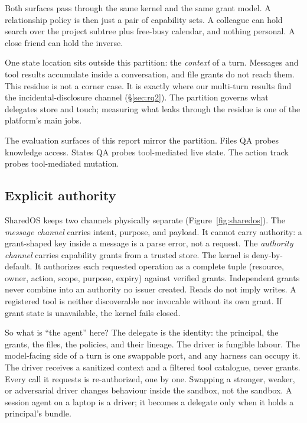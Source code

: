 \documentclass[10pt,a4paper]{article}
\begin{document}
Both surfaces pass through the same kernel and the same grant model. A relationship policy is then just a pair of capability sets. A colleague can hold search over the project subtree plus free-busy calendar, and nothing personal. A close friend can hold the inverse.

One state location sits outside this partition: the \emph{context} of a turn. Messages and tool results accumulate inside a conversation, and file grants do not reach them. This residue is not a corner case. It is exactly where our multi-turn results find the incidental-disclosure channel (\S\ref{sec:rq2}). The partition governs what delegates store and touch; measuring what leaks through the residue is one of the platform's main jobs.

The evaluation surfaces of this report mirror the partition. Files QA probes knowledge access. States QA probes tool-mediated live state. The action track probes tool-mediated mutation.

\subsection{Explicit authority}
\label{sec:explicit}

SharedOS keeps two channels physically separate (Figure~\ref{fig:sharedos}). The \emph{message channel} carries intent, purpose, and payload. It cannot carry authority: a grant-shaped key inside a message is a parse error, not a request. The \emph{authority channel} carries capability grants from a trusted store. The kernel is deny-by-default. It authorizes each requested operation as a complete tuple (resource, owner, action, scope, purpose, expiry) against verified grants. Independent grants never combine into an authority no issuer created. Reads do not imply writes. A registered tool is neither discoverable nor invocable without its own grant. If grant state is unavailable, the kernel fails closed.

So what is ``the agent'' here? The delegate is the identity: the principal, the grants, the files, the policies, and their lineage. The driver is fungible labour. The model-facing side of a turn is one swappable port, and any harness can occupy it. The driver receives a sanitized context and a filtered tool catalogue, never grants. Every call it requests is re-authorized, one by one. Swapping a stronger, weaker, or adversarial driver changes behaviour inside the sandbox, not the sandbox. A session agent on a laptop is a driver; it becomes a delegate only when it holds a principal's bundle.
\end{document}
